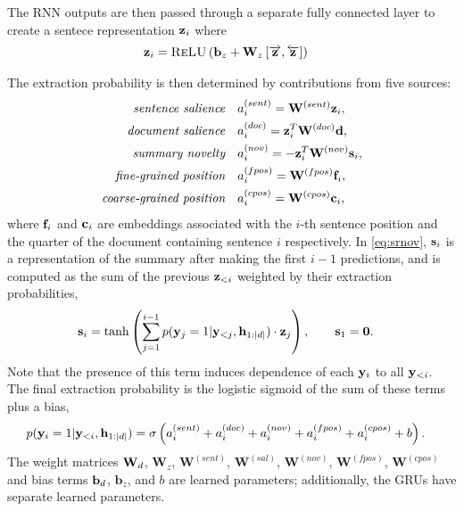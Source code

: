 \begin{appendices}
The RNN outputs are then passed through a separate fully connected layer to 
create a sentece representation $\mathbf{z}_i$ where 
\begin{align}
    \mathbf{z}_i &= \textsc{ReLU}\left(\mathbf{b}_z + \mathbf{W}_z \left[ \overrightarrow{\mathbf{z}},\overleftarrow{\mathbf{z}}\right]\right)
\end{align}

The extraction probability is then determined by contributions from five 
sources:
\begin{align}
    \textit{sentence salience} &\quad a^{(sent)}_i=\mathbf{W}^{(sent)} \mathbf{z}_i, \\
    \textit{document salience}&\quad a^{(doc)}_i = \mathbf{z}_i^T\mathbf{W}^{(doc)} \mathbf{d}, \\
    \textit{summary novelty}&\quad a^{(nov)}_i = -\mathbf{z}_i^T\mathbf{W}^{(nov)} \mathbf{s}_i, \label{eq:srnov} \\
    \textit{fine-grained position}&\quad a^{(fpos)}_i = \mathbf{W}^{(fpos)} 
    \mathbf{f}_i, \\
    \textit{coarse-grained position}&\quad a^{(cpos)}_i = \mathbf{W}^{(cpos)} 
    \mathbf{c}_i,
\end{align}
where $\mathbf{f}_i$ and $\mathbf{c}_i$ are embeddings associated with the $i$-th sentence
position and the quarter of the document containing sentence $i$ respectively.
In \autoref{eq:srnov}, $\mathbf{s}_i$ is a representation of the summary after
making the first $i-1$ predictions, and is 
computed as the
sum of the previous $\mathbf{z}_{<i}$ weighted by their extraction probabilities,
\begin{align}
    \mathbf{s}_i & = \tanh\left(\sum_{j=1}^{i-1} p(\mathbf{y}_j=1|\mathbf{y}_{<j},\mathbf{h}_{1:| d |}) \cdot \mathbf{z}_j\right), \quad\quad \mathbf{s}_1 = \mathbf{0}.
\end{align}
Note that the presence of this term induces dependence of each 
$\mathbf{y}_i$ to 
all $\mathbf{y}_{<i}$. %
The final extraction probability is the logistic sigmoid of the
sum of these terms plus a bias,
\begin{align}
    p(\mathbf{y}_i=1|\mathbf{y}_{<i}, \mathbf{h}_{1:| d |}) &= \sigma\left(
      a_i^{(sent)} + a_i^{(doc)} + a_i^{(nov)} 
  + a_i^{(fpos)}  + a_i^{(cpos)} + b \right).
\end{align}
The weight matrices $\mathbf{W}_d$, $\mathbf{W}_z$, $\mathbf{W}^{(sent)}$,
$\mathbf{W}^{(sal)}$, $\mathbf{W}^{(nov)}$, $\mathbf{W}^{(fpos)}$,
$\mathbf{W}^{(cpos)}$ and bias terms $\mathbf{b}_d$, $\mathbf{b}_z$, and 
$b$ 
are learned parameters;
additionally, the GRUs have separate learned parameters.
%



\end{appendices}
